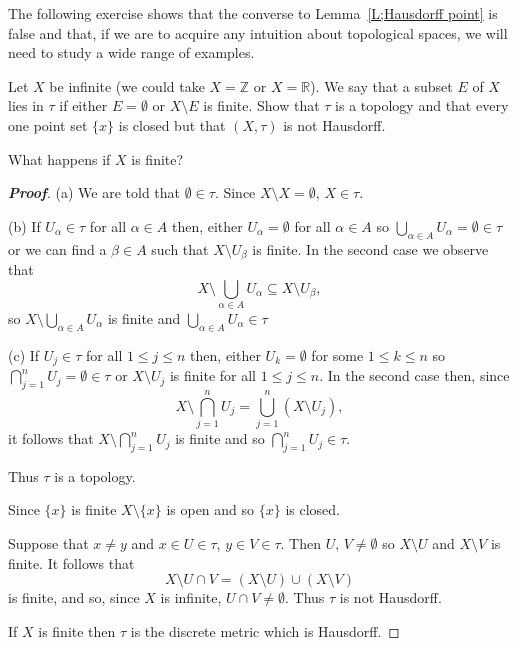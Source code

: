 The following exercise shows that the converse
to Lemma~\ref{L;Hausdorff point} is false
and that, if we are to acquire any intuition about
topological spaces, we will need to study a wide range
of examples.


\begin{theorem}\label{T;finite complement}
Let $X$ be infinite (we could take $X={\mathbb Z}$ or $X={\mathbb R}$). We say that a subset $E$ of $X$ lies in $\tau$ if either $E=\emptyset$ or $X\setminus E$ is finite. Show that $\tau$ is a topology and that every one point set $\{x\}$ is closed but that $(X,\tau)$ is not Hausdorff.

What happens if $X$ is finite?
\end{theorem}

\begin{proof}[\bf Proof] (a) We are told that $\emptyset\in \tau$.
Since $X\setminus X=\emptyset$, $X\in\tau$.

(b) If $U_{\alpha}\in\tau$ for all $\alpha\in A$ then,
either $U_{\alpha}=\emptyset$ for all $\alpha\in A$
so $\bigcup_{\alpha\in A}U_{\alpha}=\emptyset\in\tau$
or we can find a $\beta\in A$ such that
$X\setminus U_{\beta}$ is finite.
In the second case we observe that
\[X\setminus\bigcup_{\alpha\in A}U_{\alpha}
\subseteq X\setminus U_{\beta},\]so
$X\setminus\bigcup_{\alpha\in A}U_{\alpha}$
is finite and
$\bigcup_{\alpha\in A}U_{\alpha}\in\tau$

(c) If $U_{j}\in\tau$ for all $1\leq j\leq n$ then,
either $U_{k}=\emptyset$ for some $1\leq k\leq n$
so $\bigcap_{j=1}^{n}U_{j}=\emptyset\in\tau$
or $X\setminus U_{j}$ is finite for all $1\leq j\leq n$.
In the second case then, since
\[X\setminus \bigcap_{j=1}^{n}U_{j}
=\bigcup_{j=1}^{n}(X\setminus U_{j}),\]
it follows that
$X\setminus \bigcap_{j=1}^{n}U_{j}$ is finite
and so $\bigcap_{j=1}^{n}U_{j}\in\tau$.

Thus $\tau$ is a topology.

Since $\{x\}$ is finite $X\setminus\{x\}$ is open
and so $\{x\}$ is closed.

Suppose that $x \neq y$ and $x\in U\in\tau$,
$y\in V\in \tau$. Then $U,\,V\neq\emptyset$
so $X\setminus U$ and $X\setminus V$ is finite.
It follows that
\[X\setminus U\cap V=(X\setminus U)\cup(X\setminus V)\]
is finite, and so, since $X$ is infinite, $U\cap V\neq\emptyset$.
Thus $\tau$ is not Hausdorff.

If $X$ is finite then $\tau$ is the discrete metric
which is Hausdorff.
\end{proof}


